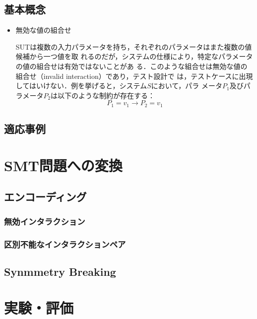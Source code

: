 \documentclass[paper]{ieicej}
\begin{document}
\subsection{基本概念}
\label{subsec:concept}
\begin{itemize}
\item 無効な値の組合せ

SUTは複数の入力パラメータを持ち，それぞれのパラメータはまた複数の値候補から一つ値を取
れるのだが，システムの仕様により，特定なパラメータの値の組合せは有効ではないことがあ
る．このような組合せは無効な値の組合せ（invalid interaction）であり，テスト設計で
は，テストケースに出現してはいけない．例を挙げると，システム$S$において，パラ
メータ$P_1$及びパラメータ$P_2$は以下のような制約が存在する：
\[ P_1  =  v_1 \to P_2  =  v_1 \]





\end{itemize}
\subsection{適応事例}
\label{subsec:example}

\section{SMT問題への変換}
\label{sec:SMT}

\subsection{エンコーディング}
\label{subsec:encoding}

\subsubsection{無効インタラクション}
\label{subsec:invalid}

\subsubsection{区別不能なインタラクションペア}
\label{subsec:indistinguishable}


\subsection{Synmmetry Breaking}
\label{subsec:symmetry}

\section{実験・評価}
\label{sec:experiments}
\end{document}
